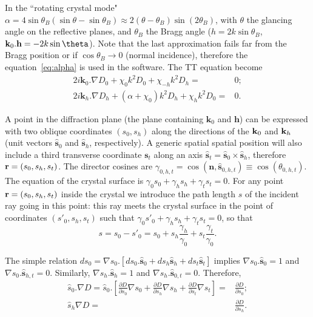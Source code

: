 \documentclass{iucr}
\newcommand{\cyan}[1]{{\color{cyan(process)}#1}}
\newcommand{\inred}[1]{{\color{red}#1}}
\begin{document}
In the ``rotating crystal mode" $\alpha=4 \sin \theta_B (\sin \theta - \sin \theta_B) \approx 2 (\theta-\theta_B) \sin (2\theta_B)$, with $\theta$ the glancing angle on the reflective planes, and $\theta_B$ the Bragg angle ($h=2 k \sin\theta_B$, $\textbf k_0 . \textbf h = -2 k \sin\theta$). Note that the last approximation fails far from the Bragg position or if $\cos\theta_B \rightarrow 0$ (normal incidence)\cyan{, therefore the equation~\ref{eq:alpha} is used in the software}.
The TT equation become
\begin{subequations}
\label{eq:TTvectorAlpha}
\begin{align}
2 i \textbf{k}_0 . \nabla D_0 + \chi_0 k^2 D_0 + \chi_{-h} k^2 D_h =& 0; \\
2 i \textbf{k}_h . \nabla D_h + (\alpha + \chi_0) k^2 D_h + \chi_{h} k^2 D_0 =& 0.
\end{align}
\end{subequations}

A point in the diffraction plane (the plane containing $\textbf{k}_0$ and $\textbf{h}$) 
can be expressed with two oblique coordinates $(s_0,s_h)$ along the directions of the $\textbf k_0$ and $\textbf k_h$ (unit vectors $\hat{ \textbf{s}}_{0}$ and $\hat{ \textbf{s}}_{h}$, respectively). A generic spatial spatial position will also include a third \cyan{transverse} coordinate $\textbf{s}_t$ along an axis $\hat{\textbf{s}}_t=\hat{\textbf{s}}_0 \times \hat{\textbf{s}}_h$, therefore $\textbf r=(s_0,s_h,s_t)$. The director cosines are $\gamma_{0,h,t}=\cos(\textbf{n} , \hat{\textbf{s}}_{0,h,t}) \equiv \cos(\theta_{0,h,t})$. The equation of the crystal surface is $\gamma_0 s_0 + \gamma_h s_h + \gamma_t s_t=0$. For any point $\textbf r=(s_0,s_h,s_t)$ inside the crystal we introduce the path length $s$ \inred{of the incident ray going in this point}: this ray meets the crystal surface in the point of coordinates $(s'_0,s_h,s_t)$ such that $\gamma_0 s'_0+\gamma_h s_h + \gamma_t s_t=0$, so that 
\begin{equation}
\label{eq:s}
s = s_0 - s'_0 = s_0 + s_h \frac{\gamma_h}{\gamma_0} + s_t \frac{\gamma_t}{\gamma_0}.
\end{equation}

The simple relation $d s_0 = \nabla s_0 . [ d s_0 . \hat{\textbf{s}}_0 + d s_h \hat{\textbf{s}}_h + d s_t \hat{\textbf{s}}_t ]$ implies $\nabla s_0 . \hat{\textbf{s}}_0=1$ and $\nabla s_0 . \hat{\textbf{s}}_{h,t}=0$. Similarly, $\nabla s_h . \hat{\textbf{s}}_h=1$ and $\nabla s_h . \hat{\textbf{s}}_{0,t}=0$. Therefore, 
\begin{subequations}
\label{eq:equalities}
\begin{align}
\hat s_0 . \nabla D=
\hat s_0 . \left[ 
\frac{\partial D}{\partial s_0} \nabla s_0 + 
\frac{\partial D}{\partial s_h} \nabla s_h +
\frac{\partial D}{\partial s_t} \nabla s_t
\right] 
=& \frac{\partial D}{\partial s_0}
; \\
\hat s_h \nabla D =& 
\frac{\partial D}{\partial s_h}.
\end{align}
\end{subequations}
\end{document}
